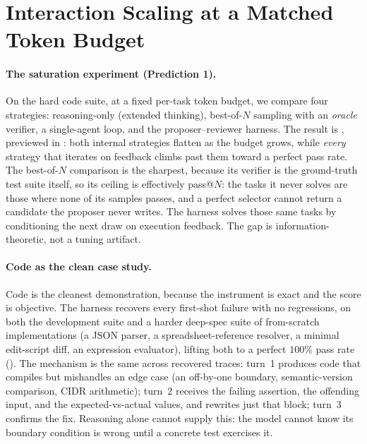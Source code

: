 \section{Interaction Scaling at a Matched Token Budget}
\label{sec:interaction}

\paragraph{The saturation experiment (Prediction 1).} On the hard code suite, at a fixed per-task token budget, we compare four strategies: reasoning-only (extended thinking), best-of-$N$ sampling with an \emph{oracle} verifier, a single-agent loop, and the proposer--reviewer harness. The result is , previewed in : both internal strategies flatten as the budget grows, while \emph{every} strategy that iterates on feedback climbs past them toward a perfect pass rate. The best-of-$N$ comparison is the sharpest, because its verifier is the ground-truth test suite itself, so its ceiling is effectively pass@$N$: the tasks it never solves are those where none of its samples passes, and a perfect selector cannot return a candidate the proposer never writes. The harness solves those same tasks by conditioning the next draw on execution feedback. The gap is information-theoretic, not a tuning artifact.

\paragraph{Code as the clean case study.} Code is the cleanest demonstration, because the instrument is exact and the score is objective. The harness recovers every first-shot failure with no regressions, on both the development suite and a harder deep-spec suite of from-scratch implementations (a JSON parser, a spreadsheet-reference resolver, a minimal edit-script diff, an expression evaluator), lifting both to a perfect $100\%$ pass rate (). The mechanism is the same across recovered traces: turn~1 produces code that compiles but mishandles an edge case (an off-by-one boundary, semantic-version comparison, CIDR arithmetic); turn~2 receives the failing assertion, the offending input, and the expected-vs-actual values, and rewrites just that block; turn~3 confirms the fix. Reasoning alone cannot supply this: the model cannot know its boundary condition is wrong until a concrete test exercises it.

